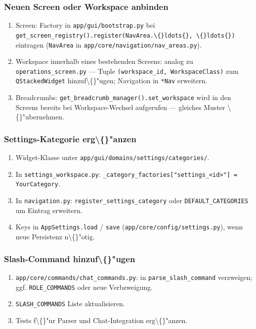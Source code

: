 \subsubsection{Neuen Screen oder Workspace anbinden}

\begin{enumerate}
\item Screen: Factory in \texttt{app/gui/bootstrap.py} bei \texttt{get\_screen\_registry().register(NavArea.\textbackslash\{\}ldots\{\}, \textbackslash\{\}ldots\{\})} eintragen (\texttt{NavArea} in \texttt{app/core/navigation/nav\_areas.py}).
\item Workspace innerhalb eines bestehenden Screens: analog zu \texttt{operations\_screen.py} --- Tuple \texttt{(workspace\_id, WorkspaceClass)} zum \texttt{QStackedWidget} hinzuf\textbackslash\{\}"ugen; Navigation in \texttt{*Nav} erweitern.
\item Breadcrumbs: \texttt{get\_breadcrumb\_manager().set\_workspace} wird in den Screens bereits bei Workspace-Wechsel aufgerufen --- gleiches Muster \textbackslash\{\}"ubernehmen.
\end{enumerate}

\subsubsection{Settings-Kategorie erg\textbackslash\{\}"anzen}

\begin{enumerate}
\item Widget-Klasse unter \texttt{app/gui/domains/settings/categories/}.
\item In \texttt{settings\_workspace.py}: \texttt{\_category\_factories["settings\_<id>"] = YourCategory}.
\item In \texttt{navigation.py}: \texttt{register\_settings\_category} oder \texttt{DEFAULT\_CATEGORIES} um Eintrag erweitern.
\item Keys in \texttt{AppSettings.load} / \texttt{save} (\texttt{app/core/config/settings.py}), wenn neue Persistenz n\textbackslash\{\}"otig.
\end{enumerate}

\subsubsection{Slash-Command hinzuf\textbackslash\{\}"ugen}

\begin{enumerate}
\item \texttt{app/core/commands/chat\_commands.py}: in \texttt{parse\_slash\_command} verzweigen; ggf. \texttt{ROLE\_COMMANDS} oder neue Verbzweigung.
\item \texttt{SLASH\_COMMANDS} Liste aktualisieren.
\item Tests f\textbackslash\{\}"ur Parser und Chat-Integration erg\textbackslash\{\}"anzen.
\end{enumerate}

